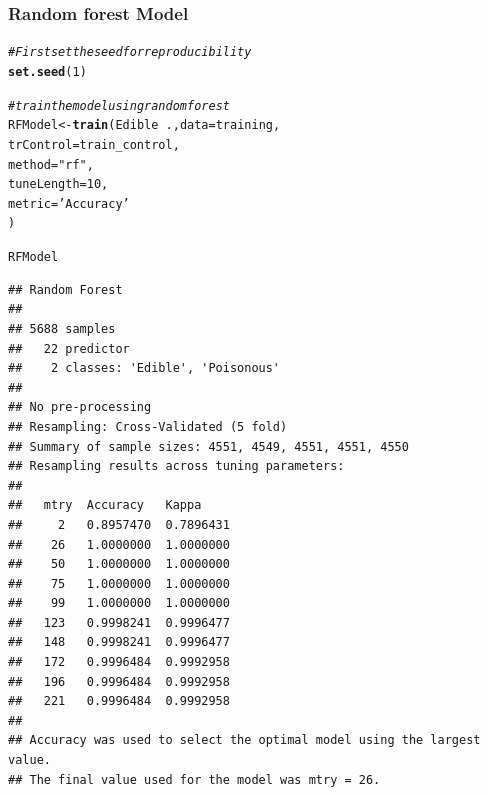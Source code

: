 \documentclass[10pt  ,usenames, dvipsnames]{article}\usepackage[]{graphicx}\usepackage[]{color}
\makeatletter
\newcommand{\hlnum}[1]{\textcolor[rgb]{0.686,0.059,0.569}{#1}}%
\newcommand{\hlstr}[1]{\textcolor[rgb]{0.192,0.494,0.8}{#1}}%
\newcommand{\hlcom}[1]{\textcolor[rgb]{0.678,0.584,0.686}{\textit{#1}}}%
\newcommand{\hlopt}[1]{\textcolor[rgb]{0,0,0}{#1}}%
\newcommand{\hlstd}[1]{\textcolor[rgb]{0.345,0.345,0.345}{#1}}%
\newcommand{\hlkwb}[1]{\textcolor[rgb]{0.69,0.353,0.396}{#1}}%
\newcommand{\hlkwc}[1]{\textcolor[rgb]{0.333,0.667,0.333}{#1}}%
\newcommand{\hlkwd}[1]{\textcolor[rgb]{0.737,0.353,0.396}{\textbf{#1}}}%
\newenvironment{kframe}{%
 \def\at@end@of@kframe{}%
 \ifinner\ifhmode%
  \def\at@end@of@kframe{\end{minipage}}%
  \begin{minipage}{\columnwidth}%
 \fi\fi%
 \def\FrameCommand##1{\hskip\@totalleftmargin \hskip-\fboxsep
 \colorbox{shadecolor}{##1}\hskip-\fboxsep
     \hskip-\linewidth \hskip-\@totalleftmargin \hskip\columnwidth}%
 \MakeFramed {\advance\hsize-\width
   \@totalleftmargin\z@ \linewidth\hsize
   \@setminipage}}%
 {\par\unskip\endMakeFramed%
 \at@end@of@kframe}
\newenvironment{knitrout}{}{} %
\makeatother
\begin{document}
\clearpage

\subsubsection{Random forest Model}

\begin{knitrout}
\color{fgcolor}\begin{kframe}
\begin{alltt}
\hlcom{#First set the seed for reproducibility}
\hlkwd{set.seed}\hlstd{(}\hlnum{1}\hlstd{)}

\hlcom{# train the model using random forest}
\hlstd{RFModel}\hlkwb{<-} \hlkwd{train}\hlstd{(Edible}\hlopt{~}\hlstd{.,} \hlkwc{data}\hlstd{=training,}
                \hlkwc{trControl}\hlstd{=train_control,}
                \hlkwc{method}\hlstd{=}\hlstr{"rf"}\hlstd{,}
                \hlkwc{tuneLength} \hlstd{=}\hlnum{10}\hlstd{,}
                \hlkwc{metric} \hlstd{=} \hlstr{'Accuracy'}
\hlstd{)}
\end{alltt}
\end{kframe}
\end{knitrout}




\begin{knitrout}
\color{fgcolor}\begin{kframe}
\begin{alltt}
\hlstd{RFModel}
\end{alltt}
\end{kframe}
\end{knitrout}


\begin{knitrout}
\color{fgcolor}\begin{kframe}
\begin{verbatim}
## Random Forest 
## 
## 5688 samples
##   22 predictor
##    2 classes: 'Edible', 'Poisonous' 
## 
## No pre-processing
## Resampling: Cross-Validated (5 fold) 
## Summary of sample sizes: 4551, 4549, 4551, 4551, 4550 
## Resampling results across tuning parameters:
## 
##   mtry  Accuracy   Kappa    
##     2   0.8957470  0.7896431
##    26   1.0000000  1.0000000
##    50   1.0000000  1.0000000
##    75   1.0000000  1.0000000
##    99   1.0000000  1.0000000
##   123   0.9998241  0.9996477
##   148   0.9998241  0.9996477
##   172   0.9996484  0.9992958
##   196   0.9996484  0.9992958
##   221   0.9996484  0.9992958
## 
## Accuracy was used to select the optimal model using the largest value.
## The final value used for the model was mtry = 26.
\end{verbatim}
\end{kframe}
\end{knitrout}
\end{document}
